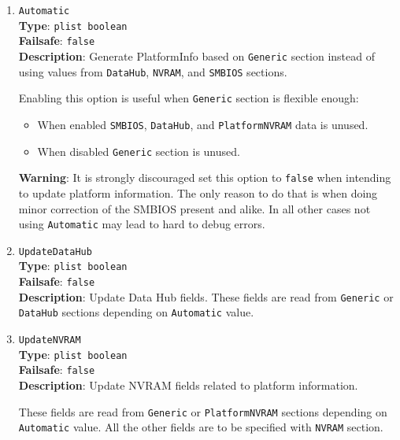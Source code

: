 \documentclass[]{article}
\providecommand{\tightlist}{%
  \setlength{\itemsep}{0pt}\setlength{\parskip}{0pt}}
\begin{document}
\begin{enumerate}
\item
  \texttt{Automatic}\\
  \textbf{Type}: \texttt{plist\ boolean}\\
  \textbf{Failsafe}: \texttt{false}\\
  \textbf{Description}: Generate PlatformInfo based on \texttt{Generic}
  section instead of using values from \texttt{DataHub}, \texttt{NVRAM},
  and \texttt{SMBIOS} sections.

  Enabling this option is useful when \texttt{Generic} section is flexible
  enough:
  \begin{itemize}
  \tightlist
  \item When enabled \texttt{SMBIOS}, \texttt{DataHub}, and
  \texttt{PlatformNVRAM} data is unused.
  \item When disabled \texttt{Generic} section is unused.
  \end{itemize}

  \textbf{Warning}: It is strongly discouraged set this option to \texttt{false}
  when intending to update platform information. The only reason to do that is
  when doing minor correction of the SMBIOS present and alike. In all other
  cases not using \texttt{Automatic} may lead to hard to debug errors.

\item
  \texttt{UpdateDataHub}\\
  \textbf{Type}: \texttt{plist\ boolean}\\
  \textbf{Failsafe}: \texttt{false}\\
  \textbf{Description}: Update Data Hub fields. These fields are read
  from \texttt{Generic} or \texttt{DataHub} sections depending on
  \texttt{Automatic} value.
\item
  \texttt{UpdateNVRAM}\\
  \textbf{Type}: \texttt{plist\ boolean}\\
  \textbf{Failsafe}: \texttt{false}\\
  \textbf{Description}: Update NVRAM fields related to platform information.

  These fields are read from \texttt{Generic} or \texttt{PlatformNVRAM} sections
  depending on \texttt{Automatic} value. All the other fields are
  to be specified with \texttt{NVRAM} section.


\end{enumerate}
\end{document}

